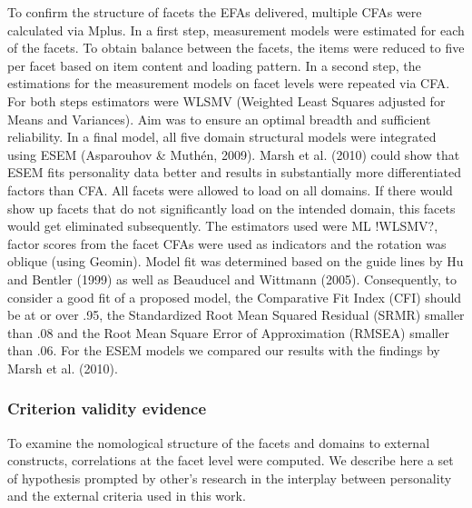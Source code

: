 \documentclass[,man,floatsintext]{apa6}
\theoremstyle{definition}
\theoremstyle{definition}
\theoremstyle{definition}
\theoremstyle{remark}
\begin{document}
To confirm the structure of facets the EFAs delivered, multiple CFAs
were calculated via Mplus. In a first step, measurement models were
estimated for each of the facets. To obtain balance between the facets,
the items were reduced to five per facet based on item content and
loading pattern. In a second step, the estimations for the measurement
models on facet levels were repeated via CFA. For both steps estimators
were WLSMV (Weighted Least Squares adjusted for Means and Variances).
Aim was to ensure an optimal breadth and sufficient reliability. In a
final model, all five domain structural models were integrated using
ESEM (Asparouhov \& Muthén, 2009). Marsh et al. (2010) could show that
ESEM fits personality data better and results in substantially more
differentiated factors than CFA. All facets were allowed to load on all
domains. If there would show up facets that do not significantly load on
the intended domain, this facets would get eliminated subsequently. The
estimators used were ML !WLSMV?, factor scores from the facet CFAs were
used as indicators and the rotation was oblique (using Geomin). Model
fit was determined based on the guide lines by Hu and Bentler (1999) as
well as Beauducel and Wittmann (2005). Consequently, to consider a good
fit of a proposed model, the Comparative Fit Index (CFI) should be at or
over .95, the Standardized Root Mean Squared Residual (SRMR) smaller
than .08 and the Root Mean Square Error of Approximation (RMSEA) smaller
than .06. For the ESEM models we compared our results with the findings
by Marsh et al. (2010).

\hypertarget{criterion-validity-evidence}{%
\subsubsection{Criterion validity
evidence}\label{criterion-validity-evidence}}

To examine the nomological structure of the facets and domains to
external constructs, correlations at the facet level were computed. We
describe here a set of hypothesis prompted by other's research in the
interplay between personality and the external criteria used in this
work.
\end{document}

